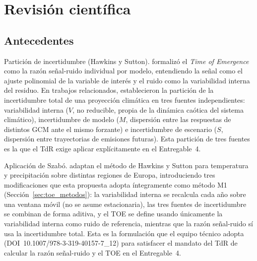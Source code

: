 \documentclass[11pt,a4paper]{article}
\begin{document}
\section{Revisi\'on cient\'ifica}
\label{sec:marco}

\subsection{Antecedentes}
\label{sec:antecedentes}

Partici\'on de incertidumbre (Hawkins y Sutton). \citet{hawkins2012} formaliz\'o el \emph{Time of Emergence} como la raz\'on se\~nal-ruido individual por modelo, entendiendo la se\~nal como el ajuste polinomial de la variable de inter\'es y el ruido como la variabilidad interna del residuo. En trabajos relacionados, \citet{hawkins2009,hawkins2011precip} establecieron la partici\'on de la incertidumbre total de una proyecci\'on clim\'atica en tres fuentes independientes: variabilidad interna ($V$, no reducible, propia de la din\'amica ca\'otica del sistema clim\'atico), incertidumbre de modelo ($M$, dispersi\'on entre las respuestas de distintos GCM ante el mismo forzante) e incertidumbre de escenario ($S$, dispersi\'on entre trayectorias de emisiones futuras). Esta partici\'on de tres fuentes es la que el TdR exige aplicar expl\'icitamente en el Entregable~4.

Aplicaci\'on de Szab\'o. \citet{szabo2016} adaptan el m\'etodo de Hawkins y Sutton para temperatura y precipitaci\'on sobre distintas regiones de Europa, introduciendo tres modificaciones que esta propuesta adopta \'integramente como m\'etodo M1 (Secci\'on~\ref{sec:toe_metodos}): la variabilidad interna se recalcula cada a\~no sobre una ventana m\'ovil (no se asume estacionaria), las tres fuentes de incertidumbre se combinan de forma aditiva, y el TOE se define usando \'unicamente la variabilidad interna como ruido de referencia, mientras que la raz\'on se\~nal-ruido s\'i usa la incertidumbre total. Esta es la formulaci\'on que el equipo t\'ecnico adopta (DOI~10.1007/978-3-319-40157-7\_12) para satisfacer el mandato del TdR de calcular la raz\'on se\~nal-ruido y el TOE en el Entregable~4.
\end{document}
